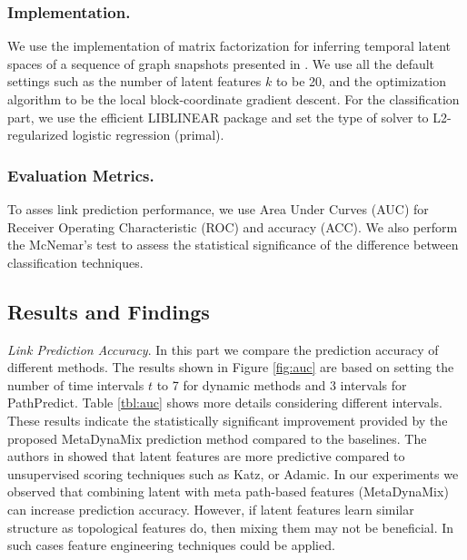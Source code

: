 \subsubsection{Implementation.} We use the implementation of matrix factorization for inferring temporal latent spaces of a sequence of graph snapshots presented in \cite{Zhu2016}. We use all the default settings such as the number of latent features $k$ to be 20, and the optimization algorithm to be the local block-coordinate gradient descent. For the classification part, we use the efficient LIBLINEAR \cite{fan2008liblinear} package and set the type of solver to L2-regularized logistic regression (primal). %


\subsubsection{Evaluation Metrics.} 

To asses link prediction performance, we use Area Under Curves (AUC) for Receiver Operating Characteristic (ROC) \cite{davis2006relationship} %
and accuracy (ACC). %
We also perform the McNemar's test \cite{mcnemar1947note} to assess the statistical significance of the difference between classification techniques.

\subsection{Results and Findings}

\textit{Link Prediction Accuracy}. In this part we compare the prediction accuracy of different methods. The  results shown in Figure \ref{fig:auc} are based on setting the number of time intervals $t$ to 7 for dynamic methods and 3 intervals for PathPredict. Table \ref{tbl:auc} shows more details considering different intervals. These results indicate the statistically significant improvement provided by the proposed MetaDynaMix prediction method compared to the baselines. The authors in \cite{menon2011link,Zhu2016} showed that latent features are more predictive compared to unsupervised scoring techniques such as Katz, or Adamic. In our experiments we observed that combining latent with meta path-based features (MetaDynaMix) can increase prediction accuracy. However, if latent features learn similar structure as topological features do, then mixing them may not be beneficial. In such cases feature engineering techniques could be applied. 


